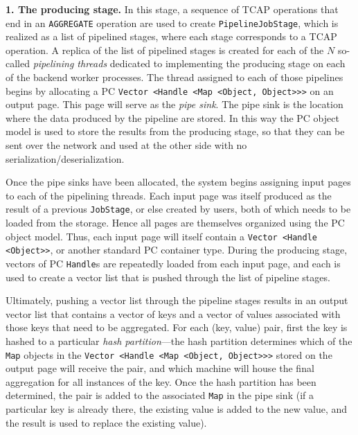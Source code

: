 \vspace{5pt}
{\bf 1. The producing stage.} In this stage, a sequence of TCAP
operations that end in an \texttt{AGGREGATE} operation are used to
create \texttt{PipelineJobStage}, which is 
realized as a list
of pipelined stages, where each stage corresponds to a TCAP operation.
A replica of the list of pipelined stages is
created for each of the $N$ so-called \emph{pipelining threads} dedicated to implementing
the producing stage on each of the backend worker processes.  
The thread assigned to each of those pipelines begins by allocating a PC \texttt{Vector <Handle <Map <Object, Object}\texttt{>}\texttt{>}\texttt{>} on an output page.  This page will serve
as the \emph{pipe sink}.  The pipe sink is
the location where the data produced by the pipeline are stored.  In
this way the PC object model is used to store the results
from the producing stage, so that they can be sent over the network and used at the other side with no serialization/deserialization.

Once the pipe sinks have been allocated,
the system begins assigning input pages to each of the pipelining 
threads.  Each input page was itself produced as the result of a
previous \texttt{JobStage}, or else created by users, both of which needs to be
loaded from the storage.  Hence all pages are themselves organized using the PC object model.  Thus, each input
page will itself contain a \texttt{Vector <Handle <Object}\texttt{>}\texttt{>},
or another standard PC container type.  During the producing stage, vectors of PC \texttt{Handle}s are repeatedly
loaded from each input page, and each is used to create a vector list that is pushed through the list of pipeline stages.

Ultimately, pushing a vector list through the pipeline stages results in an output vector list that contains a vector of keys and a vector of values 
associated with those keys that need to be aggregated.  
For each (key, value)
pair, first the key is hashed to a particular \emph{hash partition}---the hash partition determines which of the \texttt{Map}
objects in the \texttt{Vector <Handle <Map <Object, Object}\texttt{>}\texttt{>}\texttt{>} stored on the output page will receive the pair, and which machine will house the final aggregation
for all instances of the key.  Once the hash partition has been determined,
the pair is added to the associated \texttt{Map} in the pipe sink
(if a particular key is already there, the
existing value is added to the new value, and the result is used to replace the existing value).  

